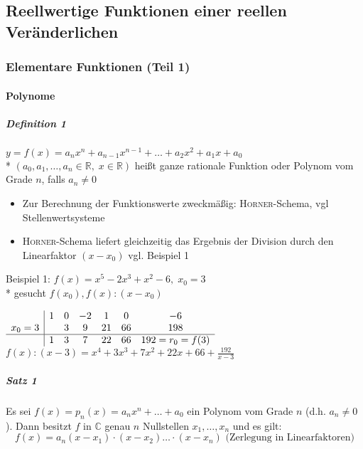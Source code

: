 \documentclass[a4paper]{scrartcl}
\begin{document}
\subsection{Reellwertige Funktionen einer reellen Veränderlichen}
\subsubsection{Elementare Funktionen (Teil 1)}
\paragraph{Polynome}
\subparagraph{Definition 1} $y=f(x)=a_nx^n + a_{n-1}x^{n-1} + \dots + a_2x^2 + a_1x + a_0$\\*
$(a_0,a_1,\dots , a_n \in \mathbb{R}, \; x \in \mathbb{R})$ heißt ganze rationale Funktion oder Polynom vom Grade $n$, falls $a_n \neq 0 $

\begin{itemize}
\item Zur Berechnung der Funktionswerte zweckmäßig: \textsc{Horner}-Schema, vgl Stellenwertsysteme
\item \textsc{Horner}-Schema liefert gleichzeitig das Ergebnis der Division durch den Linearfaktor $(x-x_0)$ vgl. Beispiel 1
\end{itemize}

Beispiel 1: $f(x) = x^5 - 2x^3 +x^2 -6, \; x_0 = 3$\\*
gesucht $f(x_0), f(x):(x-x_0)$

$\begin{array}{c|cccccc}
&1&0&-2&1&0&-6\\
x_0 = 3& & 3&9&21&66&198\\ \hline
& 1 &3&7&22&66&192=r_0 = f(3)
\end{array}$\\
$f(x):(x-3) = x^4 + 3x^3 + 7x^2 + 22x + 66 + \frac{192}{x-3}$

\subparagraph{Satz 1} Es sei $f(x)= p_n(x) = a_n x^n + \dots + a_0$ ein Polynom vom Grade $n$ (d.h. $a_n \neq 0$). Dann besitzt $f$ in $\mathbb{C}$ genau $n$ Nullstellen $x_1,\dots , x_n$ und es gilt:
\begin{equation}\label{Satz1*}
f(x)=a_n(x-x_1)\cdot (x-x_2)\dots \cdot (x-x_n) \text{ (Zerlegung in Linearfaktoren)}
\end{equation}
\end{document}
